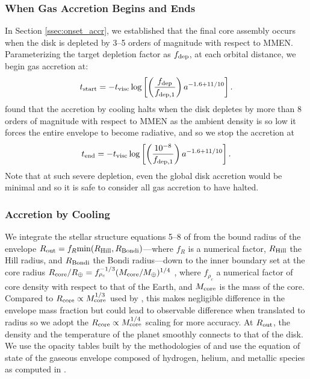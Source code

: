 \documentclass[twocolumn]{aastex631}
\begin{document}
\subsubsection{When Gas Accretion Begins and Ends}
In Section \ref{ssec:onset_accr}, we established that the final core assembly occurs when the disk is depleted by 3--5 orders of magnitude with respect to MMEN. Parameterizing the target depletion factor as $f_{\rm dep}$, at each orbital distance, we begin gas accretion at:
\begin{equation}
    t_{\rm start} = - t_{\rm visc}\log\left[\left(\frac{f_{\rm dep}}{f_{\rm dep,1}}\right)a^{-1.6+11/10}\right].
    \label{eq:tstart}
\end{equation}
\citet{Lee18} found that the accretion by cooling halts when the disk depletes by more than 8 orders of magnitude with respect to MMEN as the ambient density is so low it forces the entire envelope to become radiative, and so we stop the accretion at
\begin{equation}
    t_{\rm end} = - t_{\rm visc}\log\left[\left(\frac{10^{-8}}{f_{\rm dep,1}}\right)a^{-1.6+11/10}\right].
    \label{eq:tend}
\end{equation}
Note that at such severe depletion, even the global disk accretion would be minimal and so it is safe to consider all gas accretion to have halted.

\subsubsection{Accretion by Cooling}

We integrate the stellar structure equations 5--8 of \citet{Lee14} from the bound radius of the envelope $R_{\rm out} = f_R {\rm min}(R_{\rm Hill}, R_{\rm Bondi})$---where $f_R$ is a numerical factor, $R_{\rm Hill}$ the Hill radius, and $R_{\rm Bondi}$ the Bondi radius---down to the inner boundary set at the core radius $R_{\rm core}/R_\oplus = f_{\rho_c}^{-1/3}(M_{\rm core}/M_\oplus)^{1/4}$ \citep{Valencia06}, where $f_{\rho_c}$ a numerical factor of core density with respect to that of the Earth, and $M_{\rm core}$ is the mass of the core. Compared to $R_{\rm core} \propto M_{\rm core}^{1/3}$ used by \citet{Lee14}, this makes negligible difference in the envelope mass fraction but could lead to observable difference when translated to radius so we adopt the $R_{\rm core} \propto M_{\rm core}^{1/4}$ scaling for more accuracy. At $R_{\rm out}$, the density and the temperature of the planet smoothly connects to that of the disk. We use the opacity tables built by the methodologies of \citet{Ferguson05} and use the equation of state of the gaseous envelope composed of hydrogen, helium, and metallic species as computed in \citet{Lee14}.
\end{document}
